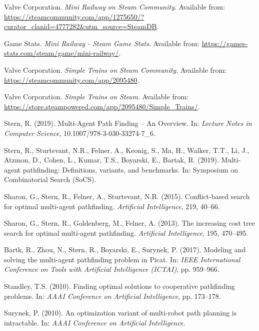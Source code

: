 \begin{thebibliography}{1}
	Valve Corporation. \textit{Mini Railway on Steam Community}. Available from: \url{https://steamcommunity.com/app/1275650/?curator_clanid=4777282&utm_source=SteamDB}.
	
	Game Stats. \textit{Mini Railway - Steam Game Stats}. Available from: \url{https://games-stats.com/steam/game/mini-railway/}.
	
	Valve Corporation. \textit{Simple Trains on Steam Community}. Available from: \url{https://steamcommunity.com/app/2095480}.
	
	Valve Corporation. \textit{Simple Trains on Steam}. Available from: \url{https://store.steampowered.com/app/2095480/Simple_Trains/}.
	
	
	Stern, R. (2019). Multi-Agent Path Finding – An Overview. In: \textit{Lecture Notes in Computer Science}, 10.1007/978-3-030-33274-7\_6.
	
	Stern, R., Sturtevant, N.R., Felner, A., Keonig, S., Ma, H., Walker, T.T., Li, J., Atzmon, D., Cohen, L., Kumar, T.S., Boyarski, E., Bartak, R. (2019). Multi-agent pathfinding: Definitions, variants, and benchmarks. In: Symposium on Combinatorial Search (SoCS).
	
	Sharon, G., Stern, R., Felner, A., Sturtevant, N.R. (2015). Conflict-based search for optimal multi-agent pathfinding. \textit{Artificial Intelligence}, 219, 40–66.
	
	Sharon, G., Stern, R., Goldenberg, M., Felner, A. (2013). The increasing cost tree search for optimal multi-agent pathfinding. \textit{Artificial Intelligence}, 195, 470–495.
	
	
	Bartk, R., Zhou, N., Stern, R., Boyarski, E., Surynek, P. (2017). Modeling and solving the multi-agent pathfinding problem in Picat. In: \textit{IEEE International Conference on Tools with Artificial Intelligence (ICTAI)}, pp. 959–966.
	
	Standley, T.S. (2010). Finding optimal solutions to cooperative pathfinding problems. In: \textit{AAAI Conference on Artificial Intelligence}, pp. 173–178.
	
	Surynek, P. (2010). An optimization variant of multi-robot path planning is intractable. In: \textit{AAAI Conference on Artificial Intelligence}.
	

\end{thebibliography}
